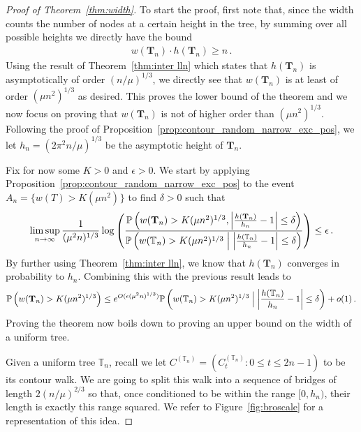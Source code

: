 \documentclass{article}
\newcommand{\pr}{\mathbb{P}}								%
\newcommand{\Prob}[1]{\pr\left(#1\right)}					%
\newcommand{\CProb}[2]{\pr\left(#1 \Bigm| #2\right)}	%
\newcommand{\1}{\mathbbm{1}}								%
\theoremstyle{definition}
\numberwithin{equation}{section}
\newcommand{\bT}{\mathbf T}
\newcommand{\T}{\mathbb T}
\begin{document}
\begin{proof}[Proof of Theorem~\ref{thm:width}]
    To start the proof, first note that, since the width counts the number of nodes at a certain height in the tree, by summing over all possible heights we directly have the bound
    \begin{align*}
        w(\bT_n)\cdot h(\bT_n)\geq n\,.
    \end{align*}
    Using the result of Theorem~\ref{thm:inter lln} which states that $h(\bT_n)$ is asymptotically of order $(n/\mu)^{1/3}$, we directly see that $w(\bT_n)$ is at least of order $(\mu n^2)^{1/3}$ as desired.
    This proves the lower bound of the theorem and we now focus on proving that $w(\bT_n)$ is not of higher order than $(\mu n^2)^{1/3}$.
    Following the proof of Proposition~\ref{prop:contour_random_narrow_exc_pos}, we let $h_n=(2\pi^2n/\mu)^{1/3}$ be the asymptotic height of $\bT_n$.

    Fix for now some $K>0$ and $\epsilon>0$.
    We start by applying Proposition~\ref{prop:contour_random_narrow_exc_pos} to the event $A_n=\{w(T)>K(\mu n^2)^{}\}$ to find $\delta>0$ such that
    \begin{align*}
        \limsup_{n\rightarrow\infty}\frac{1}{(\mu^2n)^{1/3}}\log\left(\frac{\Prob{w(\bT_n)>K(\mu n^2)^{1/3},\left|\frac{h(\bT_n)}{h_n}-1\right|\leq\delta}}{\CProb{w(\T_n)>K(\mu n^2)^{1/3}}{\left|\frac{h(\T_n)}{h_n}-1\right|\leq\delta}}\right)\leq\epsilon\,.
    \end{align*}
    By further using Theorem~\ref{thm:inter lln}, we know that $h(\bT_n)$ converges in probability to $h_n$.
    Combining this with the previous result leads to
    \begin{align}\label{eq:bound width}
        \Prob{\Big.w(\bT_n)>K(\mu n^2)^{1/3}}\leq e^{O(\epsilon(\mu^2n)^{1/3})}\CProb{w(\T_n)>K(\mu n^2)^{1/3}}{\left|\frac{h(\T_n)}{h_n}-1\right|\leq\delta}+o(1)\,.
    \end{align}
    Proving the theorem now boils down to proving an upper bound on the width of a uniform tree.

    Given a uniform tree $\T_n$, recall we let $C^{(\T_n)}=(C^{(\T_n)}_t:0\leq t\leq 2n-1)$ to be its contour walk.
    We are going to split this walk into a sequence of bridges of length $2(n/\mu)^{2/3}$ so that, once conditioned to be within the range $[0,h_n)$, their length is exactly this range squared. 
    We refer to Figure~\ref{fig:broscale} for a representation of this idea.


\end{proof}
\end{document}
